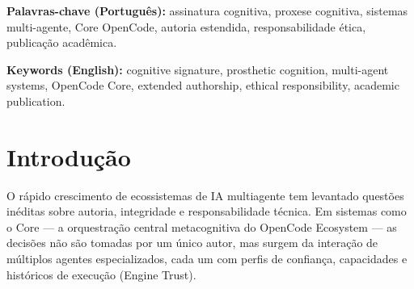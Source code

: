 \documentclass[12pt,a4paper]{article}
\begin{document}
\begin{abstract}
\textbf{Objective:} Investigate the concept of cognitive signature within agentico orchestrated system ecosystems, using the Core architecture (MarceloClaro / OpenCode Ecosystem Core) as a case study.

\textbf{Method:} Analysis of technical data from Evolution Registry (854 cycles), Trust Engine scores, Spec Engine compliance and MetaBus episodic memory, funded exclusively on the two "active and auditables" primary sources: Clark Chalmers 1998 and Verbveek 2005.

\textbf{Main Results:} Cognitive signature is reinterpretated as "prosthetic extension tracker" — interpretable documented pattern of how human cognition is mediated, extended and articulated with an agente orchestrator, and not as mind or personality property of the system. We identified six distinct cognitive signatures corresponding to the six phases of the SDD/TDD protocol (Perceive, Specify, Delegate, Execute, Verify, Reflect).

\textbf{Conclusions:} Cognitive prosthetic signature represents necessary reconceptualization of authorship and traceability in environments where human cognition extends through agentico technologies. The Core provides technical infrastructure (Trust Engine, Evolution Registry, Spec Engine) for observability and auditability of this signature.
\end{abstract}

\vspace{0.5cm}
\begin{flushleft}
\textbf{Palavras-chave (Português):} assinatura cognitiva, proxese cognitiva, sistemas multi-agente, Core OpenCode, autoria estendida, responsabilidade ética, publicação acadêmica.

\textbf{Keywords (English):} cognitive signature, prosthetic cognition, multi-agent systems, OpenCode Core, extended authorship, ethical responsibility, academic publication.
\end{flushleft}

\section{Introdução}

O rápido crescimento de ecossistemas de IA multiagente tem levantado questões inéditas sobre autoria, integridade e responsabilidade técnica. Em sistemas como o Core — a orquestração central metacognitiva do OpenCode Ecosystem — as decisões não são tomadas por um único autor, mas surgem da interação de múltiplos agentes especializados, cada um com perfis de confiança, capacidades e históricos de execução (Engine Trust).
\end{document}
